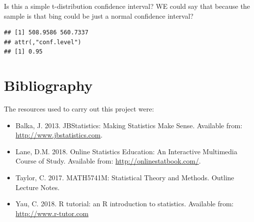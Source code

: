 \documentclass[]{article}
\newenvironment{Shaded}{\begin{snugshade}}{\end{snugshade}}
\newcommand{\KeywordTok}[1]{\textcolor[rgb]{0.13,0.29,0.53}{\textbf{{#1}}}}
\newcommand{\DataTypeTok}[1]{\textcolor[rgb]{0.13,0.29,0.53}{{#1}}}
\newcommand{\StringTok}[1]{\textcolor[rgb]{0.31,0.60,0.02}{{#1}}}
\newcommand{\CommentTok}[1]{\textcolor[rgb]{0.56,0.35,0.01}{\textit{{#1}}}}
\newcommand{\NormalTok}[1]{{#1}}
\providecommand{\tightlist}{%
  \setlength{\itemsep}{0pt}\setlength{\parskip}{0pt}}
\begin{document}
Is this a simple t-distribution confidence interval? WE could say that
because the sample is that bing could be just a normal confidence
interval?

\begin{Shaded}
\end{Shaded}

\begin{Shaded}
\end{Shaded}

\begin{verbatim}
## [1] 508.9586 560.7337
## attr(,"conf.level")
## [1] 0.95
\end{verbatim}

\section{Bibliography}\label{bibliography}

The resources used to carry out this project were:

\begin{itemize}
\tightlist
\item
  Balka, J. 2013. JBStatistics: Making Statistics Make Sense. Available
  from: \url{http://www.jbstatistics.com}.
\item
  Lane, D.M. 2018. Online Statistics Education: An Interactive
  Multimedia Course of Study. Available from:
  \url{http://onlinestatbook.com/}.
\item
  Taylor, C. 2017. MATH5741M: Statistical Theory and Methods. Outline
  Lecture Notes.
\item
  Yau, C. 2018. R tutorial: an R introduction to statistics. Available
  from: \url{http://www.r-tutor.com}
\end{itemize}
\end{document}
